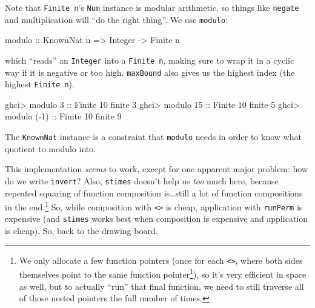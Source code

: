 \documentclass[]{article}
\newenvironment{Shaded}{}{}
\newcommand{\DataTypeTok}[1]{\textcolor[rgb]{0.56,0.13,0.00}{#1}}
\newcommand{\DecValTok}[1]{\textcolor[rgb]{0.25,0.63,0.44}{#1}}
\newcommand{\NormalTok}[1]{#1}
\newcommand{\OperatorTok}[1]{\textcolor[rgb]{0.40,0.40,0.40}{#1}}
\newcommand{\OtherTok}[1]{\textcolor[rgb]{0.00,0.44,0.13}{#1}}
\renewcommand{\href}[2]{#2\footnote{\url{#1}}}
\begin{document}
Note that \texttt{Finite\ n}'s \texttt{Num} instance is modular arithmetic, so
things like \texttt{negate} and multiplication will ``do the right thing''. We
use \texttt{modulo}:

\begin{Shaded}
\begin{Highlighting}[]
\OtherTok{modulo ::} \DataTypeTok{KnownNat}\NormalTok{ n }\OtherTok{=\textgreater{}} \DataTypeTok{Integer} \OtherTok{{-}\textgreater{}} \DataTypeTok{Finite}\NormalTok{ n}
\end{Highlighting}
\end{Shaded}

which ``reads'' an \texttt{Integer} into a \texttt{Finite\ n}, making sure to
wrap it in a cyclic way if it is negative or too high. \texttt{maxBound} also
gives us the highest index (the highest \texttt{Finite\ n}).

\begin{Shaded}
\begin{Highlighting}[]
\NormalTok{ghci}\OperatorTok{\textgreater{}}\NormalTok{ modulo }\DecValTok{3}\OtherTok{ ::} \DataTypeTok{Finite} \DecValTok{10}
\NormalTok{finite }\DecValTok{3}
\NormalTok{ghci}\OperatorTok{\textgreater{}}\NormalTok{ modulo }\DecValTok{15}\OtherTok{ ::} \DataTypeTok{Finite} \DecValTok{10}
\NormalTok{finite }\DecValTok{5}
\NormalTok{ghci}\OperatorTok{\textgreater{}}\NormalTok{ modulo (}\OperatorTok{{-}}\DecValTok{1}\NormalTok{)}\OtherTok{ ::} \DataTypeTok{Finite} \DecValTok{10}
\NormalTok{finite }\DecValTok{9}
\end{Highlighting}
\end{Shaded}

The \texttt{KnownNat} instance is a constraint that \texttt{modulo} needs in
order to know what quotient to modulo into.

This implementation \emph{seems} to work, except for one apparent major problem:
how do we write \texttt{invert}? Also, \texttt{stimes} doesn't help us
\emph{too} much here, because repeated squaring of function composition
is\ldots still a lot of function compositions in the end.\footnote{We only
  allocate a few function pointers (once for each
  \texttt{\textless{}\textgreater{}}, where
  \href{https://www.reddit.com/r/haskell/comments/jwl93i/shuffling_things_up_solving_advent_of_code_with/gcudwg4?utm_source=share&utm_medium=web2x&context=3}{both
  sides themselves point to the same function pointer}), so it's very efficient
  in space as well, but to actually ``run'' that final function, we need to
  still traverse all of those nested pointers the full number of times.} So,
while composition with \texttt{\textless{}\textgreater{}} is cheap, application
with \texttt{runPerm} is expensive (and \texttt{stimes} works best when
composition is expensive and application is cheap). So, back to the drawing
board.
\end{document}
